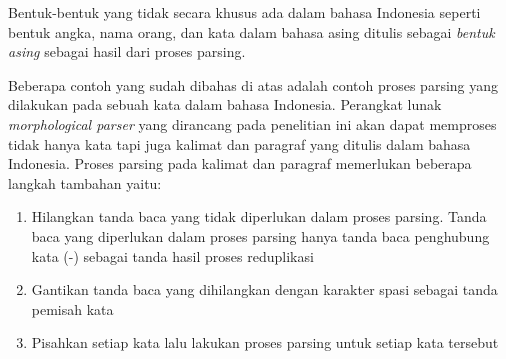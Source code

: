 Bentuk-bentuk yang tidak secara khusus ada dalam bahasa Indonesia seperti bentuk angka, nama orang, dan kata dalam bahasa asing ditulis sebagai \textit{bentuk asing} sebagai hasil dari proses parsing.

Beberapa contoh yang sudah dibahas di atas adalah contoh proses parsing yang dilakukan pada sebuah kata dalam bahasa Indonesia. Perangkat lunak \textit{morphological parser} yang dirancang pada penelitian ini akan dapat memproses tidak hanya kata tapi juga kalimat dan paragraf yang ditulis dalam bahasa Indonesia. Proses parsing pada kalimat dan paragraf memerlukan beberapa langkah tambahan yaitu:

\begin{enumerate}
	\item Hilangkan tanda baca yang tidak diperlukan dalam proses parsing. Tanda baca yang diperlukan dalam proses parsing hanya tanda baca penghubung kata (-) sebagai tanda hasil proses reduplikasi
	\item Gantikan tanda baca yang dihilangkan dengan karakter spasi sebagai tanda pemisah kata
	\item Pisahkan setiap kata lalu lakukan proses parsing untuk setiap kata tersebut
\end{enumerate}